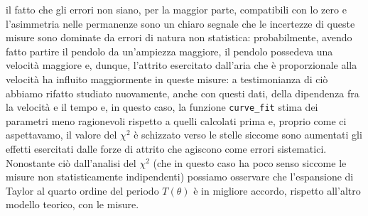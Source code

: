 \documentclass{article}
\begin{document}
\noindent il fatto che gli errori non siano, per la maggior parte, compatibili con lo zero e l'asimmetria nelle permanenze sono un chiaro segnale che le incertezze di queste misure sono dominate da errori di natura non statistica: probabilmente, avendo fatto partire il pendolo da un'ampiezza maggiore, il pendolo possedeva una velocità maggiore e, dunque, l'attrito esercitato dall'aria che è proporzionale alla velocità ha influito maggiormente in queste misure: a testimonianza di ciò abbiamo rifatto studiato nuovamente, anche con questi dati, della dipendenza fra la velocità e il tempo e, in questo caso, la funzione \texttt{curve\_fit} stima dei parametri meno ragionevoli rispetto a quelli calcolati prima e, proprio come ci aspettavamo, il valore del $\chi^2$ è schizzato verso le stelle siccome sono aumentati gli effetti esercitati dalle forze di attrito che agiscono come errori sistematici. \\
Nonostante ciò dall'analisi del $\chi^2$ (che in questo caso ha poco senso siccome le misure non statisticamente indipendenti) possiamo osservare che l'espansione di Taylor al quarto ordine del periodo $T(\theta)$ è in migliore accordo, rispetto all'altro modello teorico, con le misure.
\end{document}
